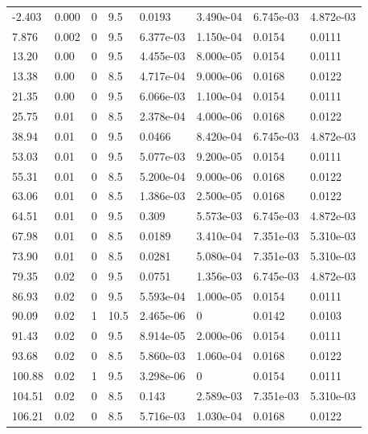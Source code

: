 \documentclass[preview]{standalone}
\begin{document}
{{\begin{tabular}{L{1.2cm}C{1.2cm} C{0.3cm}C{0.5cm} C{1.4cm}C{1.4cm} C{1.4cm}C{1.4cm}}
  -2.403  &  0.000  & 0     & 9.5 &  0.0193  & 3.490e-04  & 6.745e-03 &  4.872e-03   \\ 
  7.876  &  0.002  & 0     & 9.5 &  6.377e-03  & 1.150e-04  & 0.0154 &  0.0111   \\ 
  13.20  &  0.00  & 0     & 9.5 &  4.455e-03  & 8.000e-05  & 0.0154 &  0.0111   \\ 
  13.38  &  0.00  & 0     & 8.5 &  4.717e-04  & 9.000e-06  & 0.0168 &  0.0122   \\ 
  21.35  &  0.00  & 0     & 9.5 &  6.066e-03  & 1.100e-04  & 0.0154 &  0.0111   \\ 
  25.75  &  0.01  & 0     & 8.5 &  2.378e-04  & 4.000e-06  & 0.0168 &  0.0122   \\ 
  38.94  &  0.01  & 0     & 9.5 &  0.0466  & 8.420e-04  & 6.745e-03 &  4.872e-03   \\ 
  53.03  &  0.01  & 0     & 9.5 &  5.077e-03  & 9.200e-05  & 0.0154 &  0.0111   \\ 
  55.31  &  0.01  & 0     & 8.5 &  5.200e-04  & 9.000e-06  & 0.0168 &  0.0122   \\ 
  63.06  &  0.01  & 0     & 8.5 &  1.386e-03  & 2.500e-05  & 0.0168 &  0.0122   \\ 
  64.51  &  0.01  & 0     & 9.5 &  0.309  & 5.573e-03  & 6.745e-03 &  4.872e-03   \\ 
  67.98  &  0.01  & 0     & 8.5 &  0.0189  & 3.410e-04  & 7.351e-03 &  5.310e-03   \\ 
  73.90  &  0.01  & 0     & 8.5 &  0.0281  & 5.080e-04  & 7.351e-03 &  5.310e-03   \\ 
  79.35  &  0.02  & 0     & 9.5 &  0.0751  & 1.356e-03  & 6.745e-03 &  4.872e-03   \\ 
  86.93  &  0.02  & 0     & 9.5 &  5.593e-04  & 1.000e-05  & 0.0154 &  0.0111   \\ 
  90.09  &  0.02  & 1     & 10.5 &  2.465e-06  & 0  & 0.0142 &  0.0103   \\ 
  91.43  &  0.02  & 0     & 9.5 &  8.914e-05  & 2.000e-06  & 0.0154 &  0.0111   \\ 
  93.68  &  0.02  & 0     & 8.5 &  5.860e-03  & 1.060e-04  & 0.0168 &  0.0122   \\ 
  100.88  &  0.02  & 1     & 9.5 &  3.298e-06  & 0  & 0.0154 &  0.0111   \\ 
  104.51  &  0.02  & 0     & 8.5 &  0.143  & 2.589e-03  & 7.351e-03 &  5.310e-03   \\ 
  106.21  &  0.02  & 0     & 8.5 &  5.716e-03  & 1.030e-04  & 0.0168 &  0.0122   \\ 

\end{tabular}}}
\end{document}
